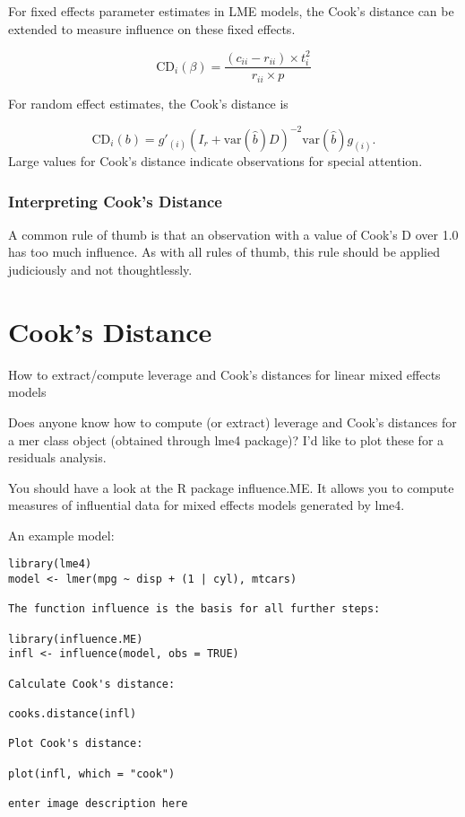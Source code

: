 \documentclass[12pt, a4paper]{article}
\begin{document}
For fixed effects parameter estimates in LME models, the  Cook's distance can be extended to measure influence on these fixed effects.

\[
\mbox{CD}_{i}(\beta) = \frac{(c_{ii} - r_{ii}) \times t^2_{i}}{r_{ii} \times p}
\]

For random effect estimates, the  Cook's distance is

\[
\mbox{CD}_{i}(b) = g{\prime}_{(i)} (I_{r} + \mbox{var}(\hat{b})D)^{-2}\mbox{var}(\hat{b})g_{(i)}.
\]
Large values for Cook's distance indicate observations for special attention.


\subsection{Interpreting Cook's Distance}
A common rule of thumb is that an observation with a value of Cook's D over 1.0 has too much influence. As with all rules of thumb, this rule should be applied judiciously and not thoughtlessly.


\chapter{Cook's Distance}
How to extract/compute leverage and Cook's distances for linear mixed effects models

Does anyone know how to compute (or extract) leverage and Cook's distances for a mer class object (obtained through lme4 package)? I'd like to plot these for a residuals analysis.

You should have a look at the R package influence.ME. It allows you to compute measures of influential data for mixed effects models generated by lme4.

An example model:

\begin{verbatim}
library(lme4)
model <- lmer(mpg ~ disp + (1 | cyl), mtcars)

The function influence is the basis for all further steps:

library(influence.ME)
infl <- influence(model, obs = TRUE)

Calculate Cook's distance:

cooks.distance(infl)

Plot Cook's distance:

plot(infl, which = "cook")

enter image description here
\end{verbatim}
\end{document}
